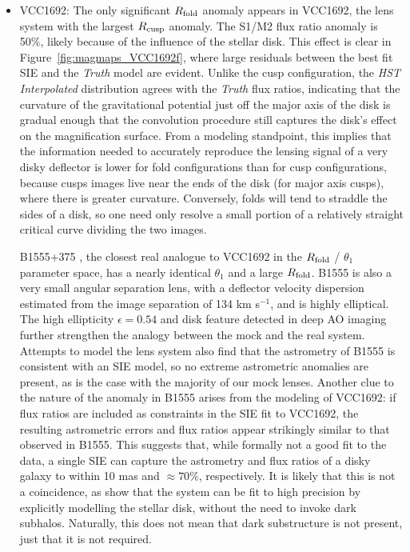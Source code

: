 \begin{itemize}
	
	\item VCC1692: The only significant $R_{\rm{fold}}$ anomaly appears in VCC1692, the lens system with the largest $R_{\rm{cusp}}$ anomaly. The S1/M2 flux ratio anomaly is 50\%, likely because of the influence of the stellar disk. This effect is clear in Figure~\ref{fig:magmaps_VCC1692f}, where large residuals between the best fit SIE and the \textit{Truth} model are evident. Unlike the cusp configuration, the \textit{HST Interpolated} distribution agrees with the \textit{Truth} flux ratios, indicating that the curvature of the gravitational potential just off the major axis of the disk is gradual enough that the convolution procedure still captures the disk's effect on the magnification surface. From a modeling standpoint, this implies that the information needed to accurately reproduce the lensing signal of a very disky deflector is lower for fold configurations than for cusp configurations, because cusps images live near the ends of the disk (for major axis cusps), where there is greater curvature. Conversely, folds will tend to straddle the sides of a disk, so one need only resolve a small portion of a relatively straight critical curve dividing the two images.
	
	\vspace{1cm} B1555+375 \cite{Marlow++99}, the closest real analogue to VCC1692 in the $R_{\rm{fold}}$ / $\theta_1$ parameter space, has a nearly identical $\theta_1$ and a large $R_{\rm{fold}}$. B1555 is also a very small angular separation lens, with a deflector velocity dispersion estimated from the image separation of 134 km s$^{-1}$, and is highly elliptical. The high ellipticity $\epsilon = 0.54$ and disk feature detected in deep AO imaging \cite{Hsueh++16} further strengthen the analogy between the mock and the real system. Attempts to model the lens system \cite{Marlow++99,MirandaJetzer07} also find that the astrometry of B1555 is consistent with an SIE model, so no extreme astrometric anomalies are present, as is the case with the majority of our mock lenses. Another clue to the nature of the anomaly in B1555 arises from the modeling of VCC1692: if flux ratios are included as constraints in the SIE fit to VCC1692, the resulting astrometric errors and flux ratios appear strikingly similar to that observed in B1555. This suggests that, while formally not a good fit to the data, a single SIE can capture the astrometry and flux ratios of a disky galaxy to within 10 mas and $\approx 70 \%$, respectively. It is likely that this is not a coincidence, as \cite{Hsueh++16} show that the system can be fit to high precision by explicitly modelling the stellar disk, without the need to invoke dark subhalos. Naturally, this does not mean that dark substructure is not present, just that it is not required.
	

\end{itemize}
